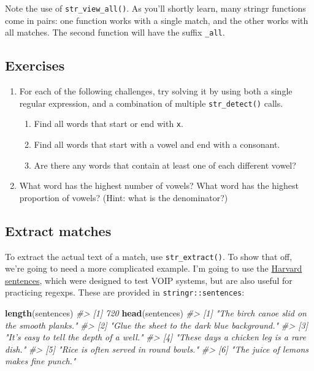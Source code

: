 \documentclass[]{book}
\newenvironment{Shaded}{\begin{snugshade}}{\end{snugshade}}
\newcommand{\KeywordTok}[1]{\textcolor[rgb]{0.13,0.29,0.53}{\textbf{{#1}}}}
\newcommand{\CommentTok}[1]{\textcolor[rgb]{0.56,0.35,0.01}{\textit{{#1}}}}
\newcommand{\NormalTok}[1]{{#1}}
\begin{document}
Note the use of \texttt{str\_view\_all()}. As you'll shortly learn, many
stringr functions come in pairs: one function works with a single match,
and the other works with all matches. The second function will have the
suffix \texttt{\_all}.

\subsection{Exercises}\label{exercises-36}

\begin{enumerate}
\def\labelenumi{\arabic{enumi}.}
\item
  For each of the following challenges, try solving it by using both a
  single regular expression, and a combination of multiple
  \texttt{str\_detect()} calls.

  \begin{enumerate}
  \def\labelenumii{\arabic{enumii}.}
  \item
    Find all words that start or end with \texttt{x}.
  \item
    Find all words that start with a vowel and end with a consonant.
  \item
    Are there any words that contain at least one of each different
    vowel?
  \end{enumerate}
\item
  What word has the highest number of vowels? What word has the highest
  proportion of vowels? (Hint: what is the denominator?)
\end{enumerate}

\subsection{Extract matches}\label{extract-matches}

To extract the actual text of a match, use \texttt{str\_extract()}. To
show that off, we're going to need a more complicated example. I'm going
to use the
\href{https://en.wikipedia.org/wiki/Harvard_sentences}{Harvard
sentences}, which were designed to test VOIP systems, but are also
useful for practicing regexps. These are provided in
\texttt{stringr::sentences}:

\begin{Shaded}
\begin{Highlighting}[]
\KeywordTok{length}\NormalTok{(sentences)}
\CommentTok{#> [1] 720}
\KeywordTok{head}\NormalTok{(sentences)}
\CommentTok{#> [1] "The birch canoe slid on the smooth planks." }
\CommentTok{#> [2] "Glue the sheet to the dark blue background."}
\CommentTok{#> [3] "It's easy to tell the depth of a well."     }
\CommentTok{#> [4] "These days a chicken leg is a rare dish."   }
\CommentTok{#> [5] "Rice is often served in round bowls."       }
\CommentTok{#> [6] "The juice of lemons makes fine punch."}
\end{Highlighting}
\end{Shaded}
\end{document}
